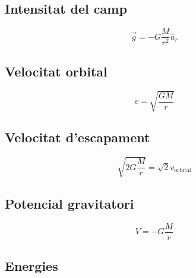 \begin{multicols}{2}

    \subsection{Intensitat del camp}
    \label{sub:intensitat_del_camp}

    \begin{equation}
        \vec{g} = -G \frac{M}{r^2} \hat{u}_r
    \end{equation}

    \subsection{Velocitat orbital}
    \label{sub:velocitat_orbital}

    \begin{equation}
        v = \sqrt{\frac{GM}{r}}
    \end{equation}

    \subsection{Velocitat d'escapament}
    \label{sub:velocitat_d_escapament}

    \begin{equation}
        \sqrt{2G\frac{M}{r}} = \sqrt{2}v_\text{orbital}
    \end{equation}

    \subsection{Potencial gravitatori}
    \label{sub:potencial_gravitatori}
    
    \begin{equation}
        V = -G \frac{M}{r}
    \end{equation}

\end{multicols}

\subsection{Energies}
\label{sub:energies}

